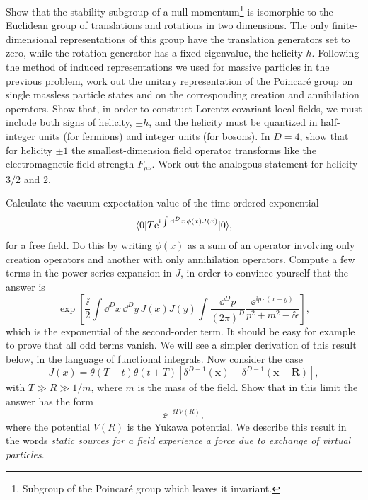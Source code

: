 \begin{banksproblems}
Show that the stability subgroup of a null momentum\footnote[6]{Subgroup of the Poincaré group which leaves it invariant.} is isomorphic to the Euclidean group of translations and rotations in two dimensions. The only finite-dimensional representations of this group have the translation generators set to zero, while the rotation generator has a fixed eigenvalue, the helicity $h$. Following the method of induced representations we used for massive particles in the previous problem, work out the unitary representation of the Poincaré group on single massless particle states and on the corresponding creation and annihilation operators. Show that, in order to construct Lorentz-covariant local fields, we must include both signs of helicity, $\pm h$, and the helicity must be quantized in half-integer units (for fermions) and integer units (for bosons). In $D=4$, show that for helicity $\pm1$ the smallest-dimension field operator transforms like the electromagnetic field strength $F_{\mu\nu}$. Work out the analogous statement for helicity $3/2$ and $2$.
\setcounter{footnote}{6}

Calculate the vacuum expectation value of the time-ordered exponential
\[
  \langle 0\rvert T\mathrm{e}^{\mathrm{i}\int\mathop{}\!\mathrm{d}^{D}x\,\phi(x)J(x)}\lvert 0\rangle,
\]
for a free field. Do this by writing $\phi(x)$ as a sum of an operator involving only creation operators and another with only annihilation operators. Compute a few terms in the power-series expansion in $J$, in order to convince yourself that the answer is
\[
  \exp\!\left[
    \frac{\ii}{2}\int\dd^{D}x\,\dd^{D}y\,J(x)J(y)
    \int\frac{\dd^{D}p}{(2\pi)^{D}}
    \frac{\ee^{\ii p\mathbin{\cdot}(x-y)}}{p^{2}+m^{2}-\ii\epsilon}
  \right],
\]
which is the exponential of the second-order term. It should be easy for example to prove that all odd terms vanish. We will see a simpler derivation of this result below, in the language of functional integrals. Now consider the case
\[
  J(x)=\theta(T-t)\theta(t+T)\left[\delta^{D-1}(\mathbf{x})-\delta^{D-1}(\mathbf{x}-\mathbf{R})\right],
\]
with $T\gg R\gg1/m$, where $m$ is the mass of the field. Show that in this limit the answer has the form
\[
  \ee^{-\ii T V(R)},
\]
where the potential $V(R)$ is the Yukawa potential. We describe this result in the words \emph{static sources for a field experience a force due to exchange of virtual particles}.

\end{banksproblems}
